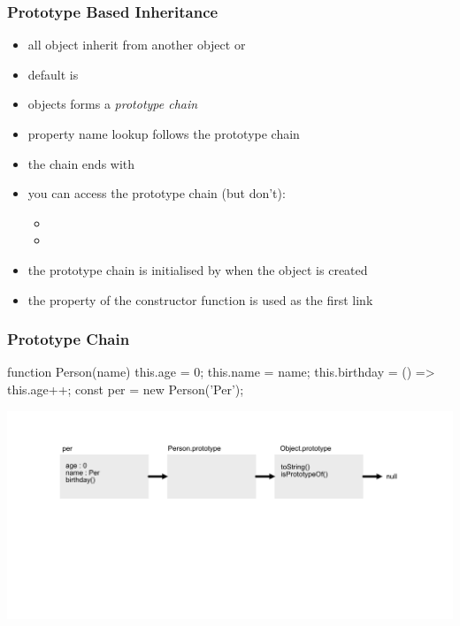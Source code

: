 \begin{frame}[fragile] \frametitle{Prototype Based Inheritance}

\begin{itemize}
  \item all object inherit from another object or 
  \item default is 
  \item objects forms a \emph{prototype chain}
  \item property name lookup follows the prototype chain
  \item the chain ends with 
  \item you can access the prototype chain (but don't):
  \begin{itemize}
    \item {}
    \item {}
  \end{itemize}
  \item the prototype chain is initialised by  when the object is created
  \item the  property of the constructor function  is used as the first link
\end{itemize}
\end{frame}

\begin{frame}[fragile]
\frametitle{Prototype Chain}
\begin{CodeBox}{}
function Person(name) {
  this.age = 0;
  this.name = name;
  this.birthday = () =>  this.age++;
}
const per = new Person('Per');
\end{CodeBox}
  \centering
  \includegraphics[width=14cm]{img/prototype_chain}

\end{frame}

